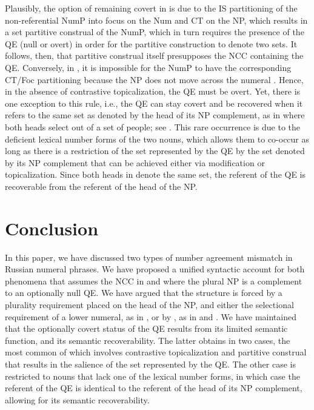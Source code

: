 \documentclass[output=paper,
modfonts,
newtxmath,
hidelinks
]{langscibook}
\begin{document}
\z 

\noindent Plausibly, the option of remaining covert in  is due to the IS partitioning of the non-referential NumP into focus on the Num and CT on the NP, which results in a set partitive construal of the NumP, which in turn requires the presence of the QE (null or overt) in order for the partitive construction to denote two sets. It follows, then, that partitive construal itself presupposes the NCC containing the QE. Conversely, in , it is impossible for the NumP to have the corresponding CT/Foc partitioning because the NP does not move across the numeral \citep{Titov2013}. Hence, in the absence of contrastive topicalization, the QE must be overt. Yet, there is one exception to this rule, i.e., the QE can stay covert and be recovered when it refers to the same set as denoted by the head of its NP\textsubscript{} complement, as in  where both heads select out of a set of people; see . This rare occurrence is due to the deficient lexical number forms of the two nouns, which allows them to co-occur as long as there is a restriction of the set represented by the QE by the set denoted by its NP complement that can be achieved either via modification or topicalization. Since both heads in  denote the same set, the referent of the QE is recoverable from the referent of the head of the NP.\textsubscript{} 

\section{Conclusion}\label{s5}

In this paper, we have discussed two types of number agreement mismatch in Russian numeral phrases. We have proposed a unified syntactic account for both phenomena that assumes the NCC in  and  where the plural NP is a complement to an optionally null QE. We have argued that the structure is forced by a plurality requirement placed on the head of the NP, and either the selectional requirement of a lower numeral, as in , or by , as in  and . We have maintained that the optionally covert status of the QE results from its limited semantic function, and its semantic recoverability. The latter obtains in two cases, the most common of which involves contrastive topicalization and partitive construal that results in the salience of the set represented by the QE. The other case is restricted to nouns that lack one of the lexical number forms, in which case the referent of the QE is identical to the referent of the head of its NP complement, allowing for its semantic recoverability. 
\end{document}
